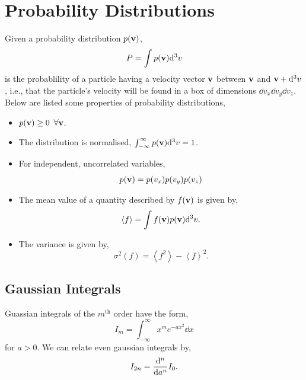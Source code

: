 \documentclass{book}
\begin{document}
\section{Probability Distributions}
Given a probability distribution $p(\vb{v})$,
\begin{equation}
	P = \int p(\vb{v}) \dd^3v
\end{equation}
is the probablility of a particle having a velocity vector $\vb{v}$ between $\vb{v}$ and $\vb{v} + \dd^3v$, i.e., that the particle's velocity will be found in a box of dimensions $\dd{v}_x\dd{v}_y\dd{v}_z$. Below are listed some properties of probability distributions,
\begin{itemize}
	\item $p(\vb{v}) \geq 0$ $\forall \vb{v}$.
	\item The distribution is normalised, $\int_{-\infty}^{\infty} p(\vb{v})\dd^3v = 1$.
	\item For independent, uncorrelated variables,
	\begin{equation}
		p(\vb{v}) = p(v_x)p(v_y)p(v_z)
	\end{equation}
	\item The mean value of a quantity described by $f(\vb{v})$ is given by,
	\begin{equation}
		\left<f\right> = \int f(\vb{v})p(\vb{v})\dd^3v.
	\end{equation}
	\item The variance is given by,
	\begin{equation}
		\sigma^2(f) = \left<f^2\right> - \left<f\right>^2.
	\end{equation}
\end{itemize}
\subsection{Gaussian Integrals}
Guassian integrals of the $m^{\text{th}}$ order have the form,
\begin{equation}
	I_m = \int_{-\infty}^{\infty}x^{m}e^{-ax^2}\dd{x}
\end{equation}
for $a > 0$. We can relate even gaussian integrals by,
\begin{equation}
	I_{2n} = \dv[n]{a}I_0.
\end{equation}
\end{document}
